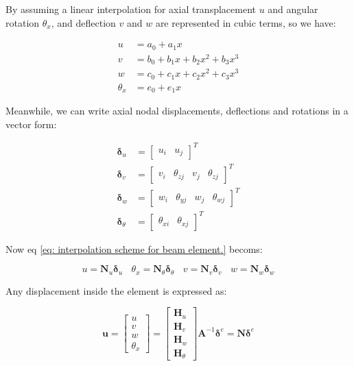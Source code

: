 By assuming a linear interpolation for axial transplacement $ u $ and angular rotation $ \theta_x $, and deflection $ v $ and $ w $ are represented in cubic terms, so we have:

\begin{equation} \label{eq: interpolation scheme for beam element.}
\begin{split} 
	u &= a_0 + a_1 x \\
	v &= b_0 + b_1 x + b_2 x^2 + b_3 x^3 \\
	 w &= c_0 + c_1 x + c_2 x^2 + c_3 x^3 \\
	 \theta_x &= e_0 + e_1 x
\end{split}
\end{equation}

Meanwhile, we can write axial nodal displacements, deflections and rotations in a vector form:

\begin{equation}
\begin{split}
\mathbf{\delta}_u &= \begin{bmatrix} u_i & u_j \end{bmatrix}^T \\
\mathbf{\delta}_v &= \begin{bmatrix} v_i & \theta_{zj} & v_j & \theta_{zj}\end{bmatrix}^T \\
\mathbf{\delta}_w &= \begin{bmatrix} w_i & \theta_{yj} & w_j & \theta_{wj}\end{bmatrix}^T \\
\mathbf{\delta}_\theta &= \begin{bmatrix} \theta_{xi} & \theta_{xj} \end{bmatrix}^T
\end{split}
\end{equation}

Now eq \ref{eq: interpolation scheme for beam element.} becoms:

\begin{equation}\label{key}
u = \mathbf{N}_u \mathbf{\delta}_u ~~~~ \theta_x = \mathbf{N}_\theta \mathbf{\delta}_\theta ~~~~ v = \mathbf{N}_v \mathbf{\delta}_v ~~~~ w = \mathbf{N}_w \mathbf{\delta}_w
\end{equation}

Any displacement inside the element is expressed as:

\begin{equation}\label{eq: displacement inside beam element}
\mathbf{u} = \begin{bmatrix}
u \\ 
v \\ 
w \\ 
\theta_x
\end{bmatrix} = \begin{bmatrix}
\mathbf{H}_u \\ 
\mathbf{H}_v \\ 
\mathbf{H}_w \\ 
\mathbf{H}_\theta
\end{bmatrix} \mathbf{A}^{-1} \mathbf{\delta}^e = \mathbf{N} \mathbf{\delta}^e
\end{equation}

